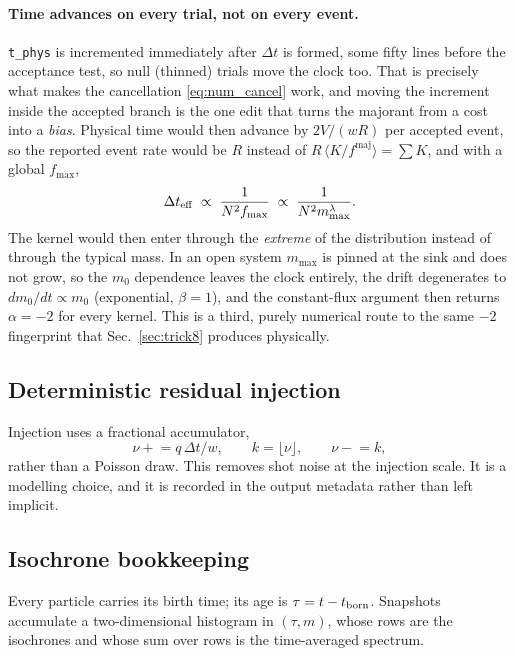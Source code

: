 \documentclass[a4paper,12pt]{article}
\newcommand{\fmaj}{f^{\mathrm{maj}}}
\newcommand{\code}[1]{\texttt{#1}}
\begin{document}
\paragraph{Time advances on every trial, not on every event.}
\code{t\_phys} is incremented immediately after $\Delta t$ is formed, some
fifty lines before the acceptance test, so null (thinned) trials move the
clock too. That is precisely what makes the cancellation
\eqref{eq:num_cancel} work, and moving the increment inside the accepted
branch is the one edit that turns the majorant from a cost into a
\emph{bias}. Physical time would then advance by $2V/(wR)$ per accepted
event, so the reported event rate would be $R$ instead of
$R\,\langle K/\fmaj\rangle = \sum K$, and with a global $f_{\max}$,
\[
  \Delta t_{\rm eff} \;\propto\; \frac{1}{N^2 f_{\max}}
                     \;\propto\; \frac{1}{N^2 m_{\max}^{\lambda}} .
\]
The kernel would then enter through the \emph{extreme} of the distribution
instead of through the typical mass. In an open system $m_{\max}$ is pinned
at the sink and does not grow, so the $m_0$ dependence leaves the clock
entirely, the drift degenerates to $dm_0/dt \propto m_0$ (exponential,
$\beta = 1$), and the constant-flux argument then returns $\alpha = -2$ for
every kernel. This is a third, purely numerical route to the same $-2$
fingerprint that Sec.~\ref{sec:trick8} produces physically.

\subsection{Deterministic residual injection}
\label{sec:trick6}

Injection uses a fractional accumulator,
\[
  \nu \mathrel{+}= q\,\Delta t/w,
  \qquad k = \lfloor \nu \rfloor,
  \qquad \nu \mathrel{-}= k,
\]
rather than a Poisson draw. This removes shot noise at the injection scale.
It is a modelling choice, and it is recorded in the output metadata rather
than left implicit.

\subsection{Isochrone bookkeeping}
\label{sec:trick7}

Every particle carries its birth time; its age is $\tau = t - t_{\rm born}$.
Snapshots accumulate a two-dimensional histogram in $(\tau, m)$, whose rows
are the isochrones and whose sum over rows is the time-averaged spectrum.
\end{document}
